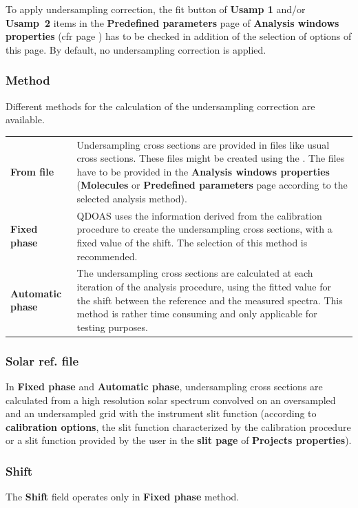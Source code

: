 To apply undersampling correction, the fit button of \textbf{Usamp 1} and/or \mbox{\textbf{Usamp 2}} items in the \textbf{Predefined parameters} page of \textbf{Analysis windows properties} (cfr page \pageref{sec:undersampling_params}) has to be checked in addition of the selection of options of this page.
By default, no undersampling correction is applied.

\subsubsection{Method}
Different methods for the calculation of the undersampling correction are available.
\begin{longtable}[h]{l p{8cm}}
\textbf{From file} & Undersampling cross sections are provided in files like usual cross sections. These files might be created using the \textbf{\nameref{sec:tool_undersampling}}. The files have to be provided in the \textbf{Analysis windows properties} (\textbf{Molecules} or \textbf{Predefined parameters} page according to the selected analysis method). \\ [6pt]
\textbf{Fixed phase} & QDOAS uses the information derived from the calibration procedure to create the undersampling cross sections, with a fixed value of the shift. The selection of this method is recommended. \\ [6pt]
\textbf{Automatic phase} & The undersampling cross sections are calculated at each iteration of the analysis procedure, using the fitted value for the shift between the reference and the measured spectra. This method is rather time consuming and only applicable for testing purposes.	 \\ [6pt]
\end{longtable}

\subsubsection{Solar ref. file}
In \textbf{Fixed phase} and \textbf{Automatic phase}, undersampling cross sections are calculated from a high resolution solar spectrum convolved on an oversampled and an undersampled grid with the instrument slit function (according to \textbf{calibration options}, the slit function characterized by the calibration procedure or a slit function provided by the user in the \textbf{slit page} of \textbf{Projects properties}).

\subsubsection{Shift}
The \textbf{Shift} field operates only in \textbf{Fixed phase} method.

